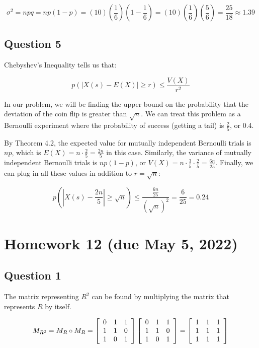 \documentclass[letterpaper, 12pt]{article}
\begin{document}
\[\sigma^2 = npq = np(1-p) = (10)\left(\frac{1}{6}\right)\left(1- \frac{1}{6}\right) = (10)\left(\frac{1}{6}\right)\left(\frac{5}{6}\right) = \frac{25}{18} \approx 1.39\]

\subsection*{Question 5}
Chebyshev's Inequality tells us that:

\[p(\left|X(s) - E(X)\right| \geq r) \leq \frac{V(X)}{r^2}\]

In our problem, we will be finding the upper bound on the probability that the deviation of the coin flip is greater than $\sqrt{n}$. We can treat this problem as a Bernoulli experiment where the probability of success (getting a tail) is $\frac{2}{5}$, or 0.4. 

By Theorem 4.2, the expected value for mutually independent Bernoulli trials is $np$, which is $E(X) = n \cdot \frac{2}{5} = \frac{2n}{5}$ in this case. Similarly, the variance of mutually independent Bernoulli trials is $np(1-p)$, or $V(X) = n \cdot \frac{3}{5} \cdot \frac{2}{5} = \frac{6n}{25}$. Finally, we can plug in all these values in addition to $r = \sqrt{n}$:

\[p\left(\left|X(s) - \frac{2n}{5}\right| \geq \sqrt{n} \right) \leq \frac{\frac{6n}{25}}{{(\sqrt{n})}^2} = \frac{6}{25} = 0.24\]

\section*{Homework 12 (due May 5, 2022)}

\subsection*{Question 1}
The matrix representing $R^2$ can be found by multiplying the matrix that represents $R$ by itself.

\[
M_{R^2} = M_R \circ M_R = 
\left[
\begin{array}{c c c}
    0 & 1 & 1 \\
    1 & 1 & 0 \\
    1 & 0 & 1
\end{array}
\right]
\left[
\begin{array}{c c c}
    0 & 1 & 1 \\
    1 & 1 & 0 \\
    1 & 0 & 1
\end{array}
\right]
= 
\left[
\begin{array}{c c c}
    1 & 1 & 1 \\
    1 & 1 & 1 \\
    1 & 1 & 1
\end{array}
\right]
\]
\end{document}
